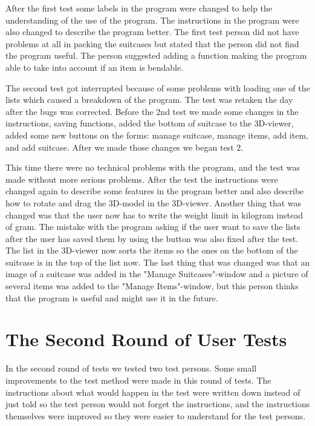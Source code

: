 After the first test some labels in the program were changed to help the understanding of the use of the program. The instructions in the program were also changed to describe the program better. The first test person did not have problems at all in packing the suitcases but stated that the person did not find the program useful. The person suggested adding a function making the program able to take into account if an item is bendable.

The second test got interrupted because of some problems with loading one of the lists which caused a breakdown of the program. The test was retaken the day after the bugs was corrected. Before the 2nd test we made some changes in the instructions, saving functions, added the bottom of suitcase to the 3D-viewer, added some new buttons on the forms: manage suitcase, manage items, add item, and add suitcase. After we made those changes we began test 2.

This time there were no technical problems with the program, and the test was made without more serious problems. After the test the instructions were changed again to describe some features in the program better and also describe how to rotate and drag the 3D-model in the 3D-viewer. Another thing that was changed was that the user now has to write the weight limit in kilogram instead of gram. The mistake with the program asking if the user want to save the lists after the user has saved them by using the button was also fixed after the test. The list in the 3D-viewer now sorts the items so the ones on the bottom of the suitcase is in the top of the list now. The last thing that was changed was that an image of a suitcase was added in the "Manage Suitcases"-window and a picture of several items was added to the "Manage Items"-window, but this person thinks that the program is useful and might use it in the future.

\section{The Second Round of User Tests}
In the second round of tests we tested two test persons. Some small improvements to the test method were made in this round of tests. The instructions about what would happen in the test were written down instead of just told so the test person would not forget the instructions, and the instructions themselves were improved so they were easier to understand for the test persons.

